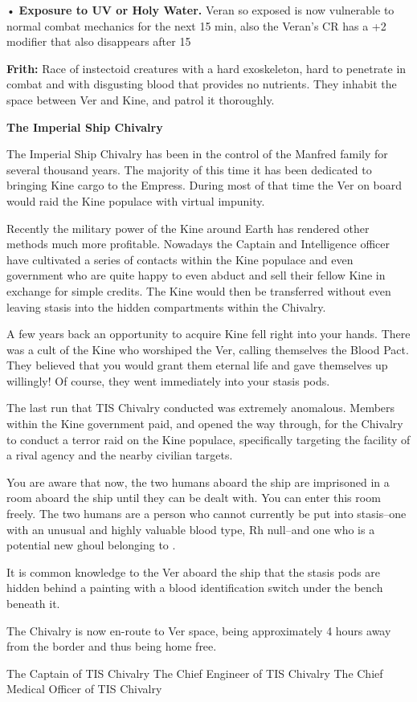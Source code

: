 \documentclass[blue]{guildcamp4}
\begin{document}
•	{\bf Exposure to UV or Holy Water.} Veran so exposed is now vulnerable to normal combat mechanics for the next 15 min, also the Veran's CR has a +2 modifier that also disappears after 15

{\bf Frith:} Race of instectoid creatures with a hard exoskeleton, hard to penetrate in combat and with disgusting blood that provides no nutrients. They inhabit the space between Ver and Kine, and patrol it thoroughly.

\begin{center}{\bf The Imperial Ship Chivalry}\end{center}

The Imperial Ship Chivalry has been in the control of the Manfred family for several thousand years. The majority of this time it has been dedicated to bringing Kine cargo to the Empress. During most of that time the Ver on board would raid the Kine populace with virtual impunity.

Recently the military power of the Kine around Earth has rendered other methods much more profitable. Nowadays the Captain and Intelligence officer have cultivated a series of contacts within the Kine populace and even government who are quite happy to even abduct and sell their fellow Kine in exchange for simple credits. The Kine would then be transferred without even leaving stasis into the hidden compartments within the Chivalry. 

A few years back an opportunity to acquire Kine fell right into your hands. There was a cult of the Kine who worshiped the Ver, calling themselves the Blood Pact. They believed that you would grant them eternal life and gave themselves up willingly! Of course, they went immediately into your stasis pods.

The last run that TIS Chivalry conducted was extremely anomalous. Members within the Kine government paid, and opened the way through, for the Chivalry to conduct a terror raid on the Kine populace, specifically targeting the facility of a rival agency and the nearby civilian targets. 

You are aware that now, the two humans aboard the ship are imprisoned in a room aboard the ship until they can be dealt with. You can enter this room freely. The two humans are a person who cannot currently be put into stasis--one with an unusual and highly valuable blood type, Rh null--and one who is a potential new ghoul belonging to \cVone{}.

It is common knowledge to the Ver aboard the ship that the stasis pods are hidden behind a painting with a blood identification switch under the bench beneath it.

The Chivalry is now en-route to Ver space, being approximately 4 hours away from the border and thus being home free.

\begin{members}
	\member{\cVone{}} The Captain of TIS Chivalry
	\member{\cVtwo{}} The Chief Engineer of TIS Chivalry
	\member{\cVthree{}} The Chief Medical Officer of TIS Chivalry

\end{members}
\end{document}
